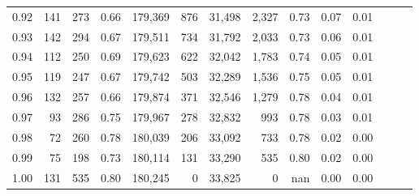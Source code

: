 \begin{tabular}{rrrrrrrrrrrrrr}
0.92 &    141 &  273 &  0.66 &  179,369 &      876 &  31,498 &   2,327 &  0.73 &  0.07 &      0.01 \\
0.93 &    142 &  294 &  0.67 &  179,511 &      734 &  31,792 &   2,033 &  0.73 &  0.06 &      0.01 \\
0.94 &    112 &  250 &  0.69 &  179,623 &      622 &  32,042 &   1,783 &  0.74 &  0.05 &      0.01 \\
0.95 &    119 &  247 &  0.67 &  179,742 &      503 &  32,289 &   1,536 &  0.75 &  0.05 &      0.01 \\
0.96 &    132 &  257 &  0.66 &  179,874 &      371 &  32,546 &   1,279 &  0.78 &  0.04 &      0.01 \\
0.97 &     93 &  286 &  0.75 &  179,967 &      278 &  32,832 &     993 &  0.78 &  0.03 &      0.01 \\
0.98 &     72 &  260 &  0.78 &  180,039 &      206 &  33,092 &     733 &  0.78 &  0.02 &      0.00 \\
0.99 &     75 &  198 &  0.73 &  180,114 &      131 &  33,290 &     535 &  0.80 &  0.02 &      0.00 \\
1.00 &    131 &  535 &  0.80 &  180,245 &        0 &  33,825 &       0 &   nan &  0.00 &      0.00 \\
\bottomrule
\end{tabular}
